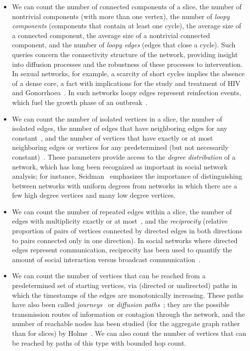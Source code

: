 \documentclass[11pt]{article}
\begin{document}
\begin{itemize}
\item We can count the number of connected components of a slice, the number of nontrivial components (with more than one vertex), the number of \emph{loopy components} (components that contain at least one cycle), the average size of a connected component,  the average size of a nontrivial connected component, and the number of \emph{loopy edges} (edges that close a cycle).  Such queries concern the connectivity structure of the network, providing insight into diffusion processes and the robustness of these processes to intervention.  In sexual networks, for example, a scarcity of short cycles implies the absence of a dense core, a fact with implications for the study and treatment of HIV \cite{BeaMooSto-AJS-04, PotPhiPlu-STI-02} and Gonorrhoea~\cite{DeSinWon-STI-04, PotMutRot-STI-02}. In such networks loopy edges represent reinfection events, which fuel the growth phase of an outbreak~\cite{PotMutRot-STI-02}.
\item We can count the number of isolated vertices in a slice, the number of isolated edges, the number of edges that have  neighboring edges for any constant~, and the number of vertices that have exactly or at most  neighboring edges or vertices for any predetermined (but not necessarily constant)~. These parameters provide access to the \emph{degree distribution} of a network, which has long been recognized as important in social network analysis; for instance, Seidman~\cite{Sei-SN-83} emphasizes the importance of distinguishing between networks with uniform degrees from networks in which there are a few high degree vertices and many low degree vertices.
\item We can count the number of repeated edges within a slice, the number of edges with multiplicity exactly or at most~, and the \emph{reciprocity} (relative proportion of pairs of vertices connected by directed edges in both directions to pairs connected only in one direction). In social networks where directed edges represent communication, reciprocity has been used to quantify the amount of social interaction versus broadcast communication~\cite{Gong11, Diego04}.
\item We can count the number of vertices that can be reached from a predetermined set of starting vertices, via (directed or undirected) paths in which the timestamps of the edges are monotonically increasing. These paths have also been called \emph{journeys}~\cite{BuiFerJar-WiOpt-03} or \emph{diffusion paths}~\cite{Moo-SF-02}; they are the possible transmission routes of information or contagion through the network, and the number of reachable nodes has been studied (for the aggregate graph rather than for slices) by Holme~\cite{Hol-PRE-05}. We can also count the number of vertices that can be reached by paths of this type with bounded hop count.

\end{itemize}
\end{document}

